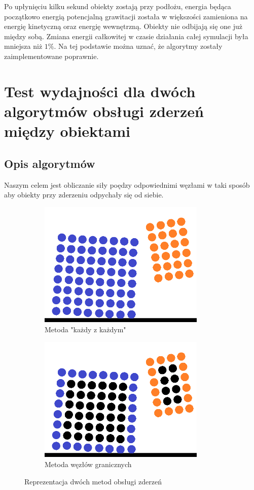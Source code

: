 \documentclass[12pt, letterpaper]{report}
\begin{document}
    Po upłynięciu kilku sekund obiekty zostają przy podłożu, energia będąca początkowo energią
    potencjalną grawitacji została w większości zamieniona na energię kinetyczną oraz energię
    wewnętrzną. Obiekty nie odbijają się one już między sobą.
    Zmiana energii całkowitej w czasie działania całej symulacji była mniejsza niż $1\%$. Na tej
    podstawie można uznać, że algorytmy zostały zaimplementowane poprawnie.


    \section{Test wydajności dla dwóch algorytmów obsługi zderzeń między obiektami}
    \subsection{Opis algorytmów}
    Naszym celem jest obliczanie siły poędzy odpowiednimi węzłami w taki sposób aby 
    obiekty przy zderzeniu odpychały się od siebie.
    
    \begin{figure}[h]

        \begin{subfigure}{0.5\textwidth}
        \includegraphics[width=0.9\linewidth, height=6cm]{objects_unoptimized} 
        \caption{Metoda "każdy z każdym"}
        \end{subfigure}
        \begin{subfigure}{0.5\textwidth}
        \includegraphics[width=0.9\linewidth, height=6cm]{objects_optimized}
        \caption{Metoda węzłów granicznych}
        \end{subfigure}
        
        \caption{Reprezentacja dwóch metod obsługi zderzeń}
    \end{figure}
\end{document}
